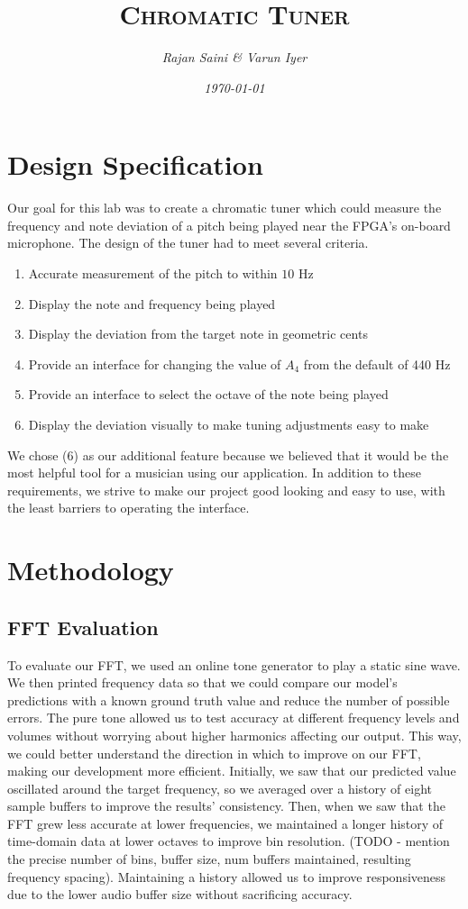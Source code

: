 \documentclass{article}
\title{\textsc{Chromatic Tuner}}
\author{\textit{Rajan Saini \& Varun Iyer}}
\date{\textit{\today}}
\begin{document}
\maketitle
\section{Design Specification}
Our goal for this lab was to create a chromatic tuner which could measure the frequency and note deviation of a pitch being played near the FPGA’s on-board microphone. The design of the tuner had to meet several criteria.
\begin{enumerate}
	\item Accurate measurement of the pitch to within $10$ Hz
	\item Display the note and frequency being played
	\item Display the deviation from the target note in geometric cents
	\item Provide an interface for changing the value of $A_4$ from the default of 440 Hz
	\item Provide an interface to select the octave of the note being played
	\item Display the deviation visually to make tuning adjustments easy to make
\end{enumerate}
	We chose (6) as our additional feature because we believed that it would be the most helpful tool for a musician using our application.
	In addition to these requirements, we strive to make our project good looking and easy to use, with the least barriers to operating the interface.
\section{Methodology}
\subsection{FFT Evaluation}
To evaluate our FFT, we used an online tone generator to play a static sine wave. We then printed frequency data so that we could compare our model's predictions with a known ground truth value and reduce the number of possible errors. The pure tone allowed us to test accuracy at different frequency levels and volumes without worrying about higher harmonics affecting our output. This way, we could better understand the direction in which to improve on our FFT, making our development more efficient. 
Initially, we saw that our predicted value oscillated around the target frequency, so we averaged over a history of eight sample buffers to improve the results' consistency. Then, when we saw that the FFT grew less accurate at lower frequencies, we maintained a longer history of time-domain data at lower octaves to improve bin resolution. (TODO - mention the precise number of bins, buffer size, num buffers maintained, resulting frequency spacing). Maintaining a history allowed us to improve responsiveness due to the lower audio buffer size without sacrificing accuracy. 
\end{document}
